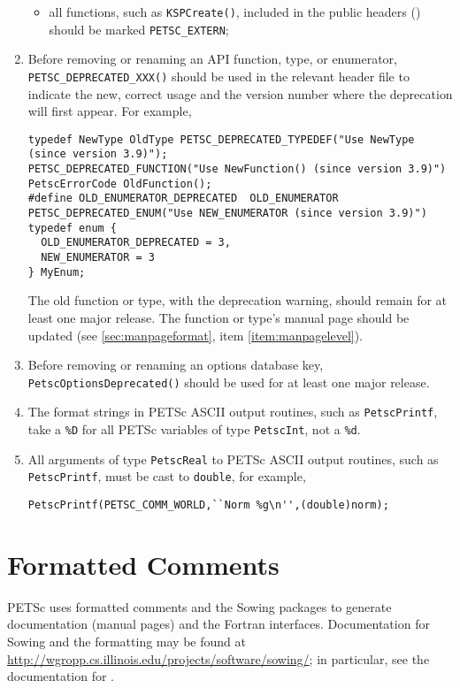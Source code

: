 \begin{enumerate}
\begin{itemize}
\item all functions, such as \lstinline{KSPCreate()}, included in the public headers () should be marked \lstinline{PETSC_EXTERN};
\end{itemize}
\item Before removing or renaming an API function, type, or enumerator,
\lstinline{PETSC_DEPRECATED_XXX()} should be used in the relevant header file to indicate the new, correct usage and the version number where the deprecation will first appear. For example,
\begin{lstlisting}
typedef NewType OldType PETSC_DEPRECATED_TYPEDEF("Use NewType (since version 3.9)");
PETSC_DEPRECATED_FUNCTION("Use NewFunction() (since version 3.9)") PetscErrorCode OldFunction();
#define OLD_ENUMERATOR_DEPRECATED  OLD_ENUMERATOR PETSC_DEPRECATED_ENUM("Use NEW_ENUMERATOR (since version 3.9)")
typedef enum {
  OLD_ENUMERATOR_DEPRECATED = 3,
  NEW_ENUMERATOR = 3
} MyEnum;
\end{lstlisting}
The old function or type, with the deprecation warning, should remain for at least one major release. The function or type's manual page should be updated (see \ref{sec:manpageformat}, item \ref{item:manpagelevel}).
\item Before removing or renaming an options database key, \lstinline{PetscOptionsDeprecated()} should be used for at least one major release.
\item The format strings in PETSc ASCII output routines, such as \lstinline{PetscPrintf}, take a \lstinline{%D} for all PETSc variables of
    type \lstinline{PetscInt}, not a \lstinline{%d}.
\item All arguments of type \lstinline{PetscReal} to PETSc ASCII output routines, such as \lstinline{PetscPrintf}, must be cast to \lstinline{double}, for example,
\begin{lstlisting}
PetscPrintf(PETSC_COMM_WORLD,``Norm %g\n'',(double)norm);
\end{lstlisting}
\end{enumerate}

\section{Formatted Comments}

PETSc uses formatted comments and the Sowing packages \cite{gropp1993sowing,gropp1993sowing2} to generate documentation (manual pages) and the Fortran interfaces.
Documentation for Sowing and the formatting may be found at \href{http://wgropp.cs.illinois.edu/projects/software/sowing/}{http://wgropp.cs.illinois.edu/projects/software/sowing/}; in particular, see the documentation for .


